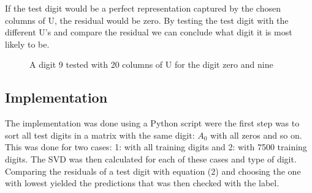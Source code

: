 \documentclass[a4paper]{article}
\begin{document}
If the test digit would be a perfect representation captured by the chosen columns of U, the residual would be zero. By testing the test digit with the different U's and compare the residual we can conclude what digit it is most likely to be.  



\begin{figure}[ht]%
    \centering
    \qquad
    \caption{A digit 9 tested with 20 columns of U for the digit zero and nine}%
    \label{fig:example}%
\end{figure}



\subsection*{Implementation}
The implementation was done using a Python script were the first step was to sort all test digits in a matrix with the same digit: $A_0$ with all zeros and so on. This was done for two cases: 1: with all training digits and 2: with 7500 training digits. The SVD was then calculated for each of these cases and type of digit. Comparing the residuals of a test digit with equation (2) and choosing the one with lowest yielded the predictions that was then checked with the label.  
\end{document}
